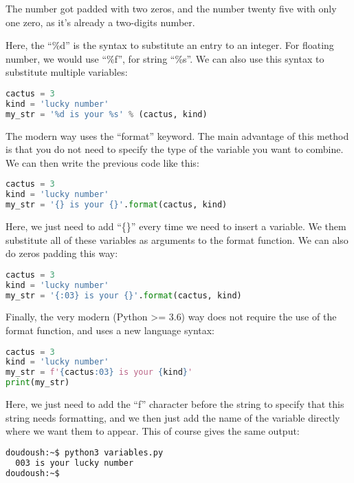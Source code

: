 The number got padded with two zeros, and the number twenty five with only one zero,
as it's already a two-digits number.

\vspace{5mm}

Here, the ``\%d'' is the syntax to substitute an entry to an integer. For floating
number, we would use ``\%f'', for string ``\%s''. We can also use this syntax to
substitute multiple variables:

\begin{lstlisting}[language=python]
cactus = 3
kind = 'lucky number'
my_str = '%d is your %s' % (cactus, kind)
\end{lstlisting}


The modern way uses the ``format'' keyword. The main advantage of this method is
that you do not need to specify the type of the variable you want to combine.
We can then write the previous code like this:

\begin{lstlisting}[language=python]
cactus = 3
kind = 'lucky number'
my_str = '{} is your {}'.format(cactus, kind)
\end{lstlisting}

Here, we just need to add ``\{\}'' every time we need to insert a variable. We them
substitute all of these variables as arguments to the format function. We can also
do zeros padding this way:

\begin{lstlisting}[language=python]
cactus = 3
kind = 'lucky number'
my_str = '{:03} is your {}'.format(cactus, kind)
\end{lstlisting}

Finally, the very modern (Python >= 3.6) way does not require the use of the format
function, and uses a new language syntax:

\begin{lstlisting}[language=python]
cactus = 3
kind = 'lucky number'
my_str = f'{cactus:03} is your {kind}'
print(my_str)
\end{lstlisting}

Here, we just need to add the ``f'' character before the string to specify that
this string needs formatting, and we then just add the name of the variable directly
where we want them to appear. This of course gives the same output:

\begin{lstlisting}[language=bash]
doudoush:~$ python3 variables.py
  003 is your lucky number
doudoush:~$
\end{lstlisting}

